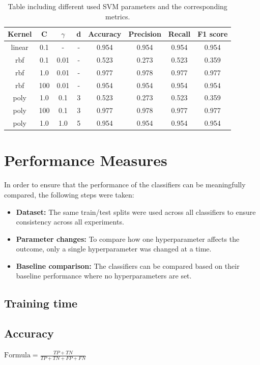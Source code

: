 \documentclass{article}
\begin{document}
\begin{table}[h!]
\centering
\begin{tabular}{||c c c c c c c c||} 
 \hline
 Kernel & C & $\gamma$ &d & Accuracy & Precision & Recall & F1 score \\ [0.5ex] 
 \hline\hline
 linear & 0.1 & - & - & 0.954 & 0.954 & 0.954 & 0.954 \\  
 rbf & 0.1 & 0.01 & - & 0.523 & 0.273 & 0.523 & 0.359 \\
 rbf & 1.0 & 0.01 & - & 0.977 & 0.978 & 0.977 & 0.977 \\
 rbf & 100 & 0.01 & - & 0.954 & 0.954 & 0.954 & 0.954 \\
 poly & 1.0 &  0.1 & 3 & 0.523 & 0.273 & 0.523 & 0.359 \\
 poly & 100 &  0.1 & 3 & 0.977 & 0.978 & 0.977 & 0.977 \\
  poly &  1.0&  1.0 & 5& 0.954 & 0.954 & 0.954 & 0.954 \\ [1ex] 
 \hline
\end{tabular}
\caption{Table including different used SVM parameters and the corresponding metrics.}
\label{table:votings_SVM}
\end{table}
\section{Performance Measures}
In order to ensure that the performance of the classifiers can be meaningfully compared, the following steps were taken:
\begin{itemize}
    \item \textbf{Dataset:} The same train/test splits were used across all classifiers to ensure consistency across all experiments.
    \item \textbf{Parameter changes:} To compare how one hyperparameter affects the outcome, only a single hyperparameter was changed at a time.
    \item \textbf{Baseline comparison:} The classifiers can be compared based on their baseline performance where no hyperparameters are set.
\end{itemize}

\subsection{Training time}
\subsection{Accuracy}
$\text{Formula} = \frac{TP + TN}{TP + TN + FP + FN}$
\end{document}
